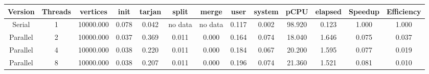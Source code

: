 \begin{tabular}{|c|c|c|c|c|c|c|c|c|c|c|c|c|}
\toprule
 Version &  Threads &  vertices &  init &  tarjan &   split &   merge &  user &  system &   pCPU &  elapsed &  Speedup &  Efficiency \\
\midrule
  Serial &        1 & 10000.000 & 0.078 &   0.042 & no data & no data & 0.117 &   0.002 & 98.920 &    0.123 &    1.000 &       1.000 \\
Parallel &        2 & 10000.000 & 0.037 &   0.369 &   0.011 &   0.000 & 0.164 &   0.074 & 18.040 &    1.646 &    0.075 &       0.037 \\
Parallel &        4 & 10000.000 & 0.038 &   0.220 &   0.011 &   0.000 & 0.184 &   0.067 & 20.200 &    1.595 &    0.077 &       0.019 \\
Parallel &        8 & 10000.000 & 0.038 &   0.207 &   0.011 &   0.000 & 0.196 &   0.074 & 21.360 &    1.521 &    0.081 &       0.010 \\
\bottomrule
\end{tabular}
